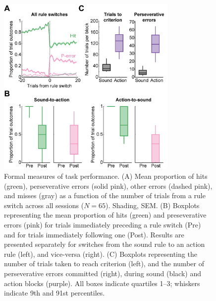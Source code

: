 \begin{figure}[htbp]

\begin{center}
\includegraphics[width=8.7cm]{Figures/Fig3.png} 
\end{center}

\caption[Formal measures of task performance.]
{Formal measures of task performance. (A) Mean proportion of hits (green), perseverative errors (solid pink), other errors (dashed pink), and misses (gray) as a function of the number of trials from a rule switch across all sessions ($N=65$). Shading, SEM. (B) Boxplots representing the mean proportion of hits (green) and preseverative errors (pink) for trials immediately preceding a rule switch (Pre) and for trials immediately following one (Post). Results are presented separately for switches from the sound rule to an action rule (left), and vice-versa (right). (C) Boxplots representing the number of trials taken to reach criterion (left), and the number of perseverative errors committed (right), during sound (black) and action blocks (purple). All boxes indicate quartiles 1--3; whiskers indicate 9th and 91st percentiles.}

\label{fig:Fig3}
\end{figure}